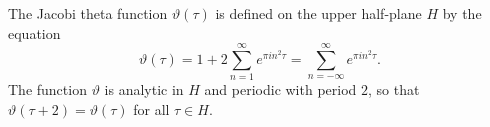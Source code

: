 The Jacobi theta function $\vartheta(\tau)$ is defined on the upper half-plane $H$ by the equation
$$\vartheta(\tau) = 1 + 2 \sum_{n=1}^{\infty} e^{\pi i n^2 \tau} = \sum_{n=-\infty}^{\infty} e^{\pi i n^2 \tau}.$$
The function $\vartheta$ is analytic in $H$ and periodic with period $2$, so that $\vartheta(\tau + 2) = \vartheta(\tau)$ for all $\tau \in H$.
